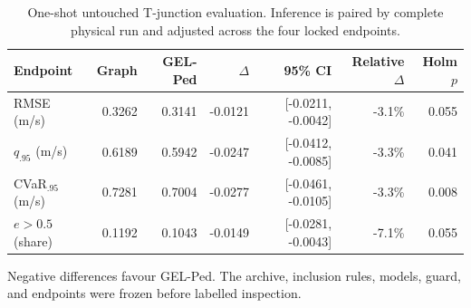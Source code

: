 \begin{table}[!htbp]
\centering
\caption{One-shot untouched T-junction evaluation. Inference is paired by complete physical run and adjusted across the four locked endpoints.}
\label{tab:r3-heldout-tjunction}
\small
\setlength{\tabcolsep}{4.2pt}
\renewcommand{\arraystretch}{1.08}
\begin{tabular}{lrrrrrr}
\toprule
Endpoint & Graph & GEL-Ped & $\Delta$ & 95\% CI & Relative $\Delta$ & Holm $p$ \\
\midrule
RMSE (m/s) & 0.3262 & 0.3141 & -0.0121 & [-0.0211, -0.0042] & -3.1\% & 0.055 \\
$q_{.95}$ (m/s) & 0.6189 & 0.5942 & -0.0247 & [-0.0412, -0.0085] & -3.3\% & 0.041 \\
CVaR$_{.95}$ (m/s) & 0.7281 & 0.7004 & -0.0277 & [-0.0461, -0.0105] & -3.3\% & 0.008 \\
$e>0.5$ (share) & 0.1192 & 0.1043 & -0.0149 & [-0.0281, -0.0043] & -7.1\% & 0.055 \\
\bottomrule
\end{tabular}
\par\vspace{2pt}\footnotesize Negative differences favour GEL-Ped. The archive, inclusion rules, models, guard, and endpoints were frozen before labelled inspection.
\end{table}

